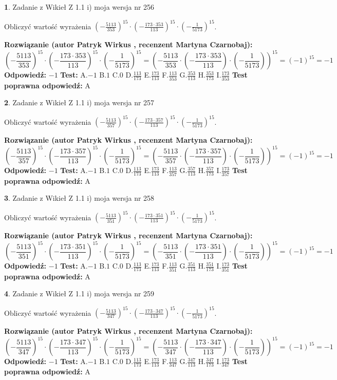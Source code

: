 \documentclass[12pt, a4paper]{article}
\theoremstyle{definition} %
\newtheorem{zad}{}
\newcommand{\zadStart}[1]{\begin{zad}#1\newline}
\newcommand{\zadStop}{\end{zad}}
\newcommand{\rozwStart}[2]{\noindent \textbf{Rozwiązanie (autor #1 , recenzent #2): }\newline}
\newcommand{\rozwStop}{\newline}
\newcommand{\odpStart}{\noindent \textbf{Odpowiedź:}\newline}
\newcommand{\odpStop}{\newline}
\newcommand{\testStart}{\noindent \textbf{Test:}\newline}
\newcommand{\testStop}{\newline}
\newcommand{\kluczStart}{\noindent \textbf{Test poprawna odpowiedź:}\newline}
\newcommand{\kluczStop}{\newline}
\begin{document}
\zadStart{Zadanie z Wikieł Z 1.1 i) moja wersja nr 256}

Obliczyć wartość wyrażenia $(-\frac{5113}{353})^{15} \cdot (-\frac{173 \cdot 353}{113})^{15} \cdot (-\frac{1}{5173})^{15}$.
\zadStop
\rozwStart{Patryk Wirkus}{Martyna Czarnobaj}
$$(-\frac{5113}{353})^{15} \cdot (-\frac{173 \cdot 353}{113})^{15} \cdot (-\frac{1}{5173})^{15} = (-\frac{5113}{353} \cdot (-\frac{173 \cdot 353}{113}) \cdot (-\frac{1}{5173}))^{15} = (-1)^{15} = -1$$
\rozwStop
\odpStart
$-1$
\odpStop
\testStart
A.$-1$ B.$1$ C.$0$ D.$\frac{113}{173}$ E.$\frac{173}{113}$
F.$\frac{113}{353}$ G.$\frac{353}{113}$
H.$\frac{353}{173}$
I.$\frac{173}{353}$
\testStop
\kluczStart
A
\kluczStop



\zadStart{Zadanie z Wikieł Z 1.1 i) moja wersja nr 257}

Obliczyć wartość wyrażenia $(-\frac{5113}{357})^{15} \cdot (-\frac{173 \cdot 357}{113})^{15} \cdot (-\frac{1}{5173})^{15}$.
\zadStop
\rozwStart{Patryk Wirkus}{Martyna Czarnobaj}
$$(-\frac{5113}{357})^{15} \cdot (-\frac{173 \cdot 357}{113})^{15} \cdot (-\frac{1}{5173})^{15} = (-\frac{5113}{357} \cdot (-\frac{173 \cdot 357}{113}) \cdot (-\frac{1}{5173}))^{15} = (-1)^{15} = -1$$
\rozwStop
\odpStart
$-1$
\odpStop
\testStart
A.$-1$ B.$1$ C.$0$ D.$\frac{113}{173}$ E.$\frac{173}{113}$
F.$\frac{113}{357}$ G.$\frac{357}{113}$
H.$\frac{357}{173}$
I.$\frac{173}{357}$
\testStop
\kluczStart
A
\kluczStop



\zadStart{Zadanie z Wikieł Z 1.1 i) moja wersja nr 258}

Obliczyć wartość wyrażenia $(-\frac{5113}{351})^{15} \cdot (-\frac{173 \cdot 351}{113})^{15} \cdot (-\frac{1}{5173})^{15}$.
\zadStop
\rozwStart{Patryk Wirkus}{Martyna Czarnobaj}
$$(-\frac{5113}{351})^{15} \cdot (-\frac{173 \cdot 351}{113})^{15} \cdot (-\frac{1}{5173})^{15} = (-\frac{5113}{351} \cdot (-\frac{173 \cdot 351}{113}) \cdot (-\frac{1}{5173}))^{15} = (-1)^{15} = -1$$
\rozwStop
\odpStart
$-1$
\odpStop
\testStart
A.$-1$ B.$1$ C.$0$ D.$\frac{113}{173}$ E.$\frac{173}{113}$
F.$\frac{113}{351}$ G.$\frac{351}{113}$
H.$\frac{351}{173}$
I.$\frac{173}{351}$
\testStop
\kluczStart
A
\kluczStop



\zadStart{Zadanie z Wikieł Z 1.1 i) moja wersja nr 259}

Obliczyć wartość wyrażenia $(-\frac{5113}{347})^{15} \cdot (-\frac{173 \cdot 347}{113})^{15} \cdot (-\frac{1}{5173})^{15}$.
\zadStop
\rozwStart{Patryk Wirkus}{Martyna Czarnobaj}
$$(-\frac{5113}{347})^{15} \cdot (-\frac{173 \cdot 347}{113})^{15} \cdot (-\frac{1}{5173})^{15} = (-\frac{5113}{347} \cdot (-\frac{173 \cdot 347}{113}) \cdot (-\frac{1}{5173}))^{15} = (-1)^{15} = -1$$
\rozwStop
\odpStart
$-1$
\odpStop
\testStart
A.$-1$ B.$1$ C.$0$ D.$\frac{113}{173}$ E.$\frac{173}{113}$
F.$\frac{113}{347}$ G.$\frac{347}{113}$
H.$\frac{347}{173}$
I.$\frac{173}{347}$
\testStop
\kluczStart
A
\kluczStop
\end{document}
